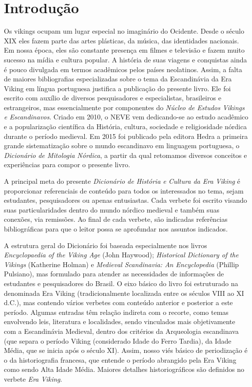 \chapter[Introdução, \emph{por Johnni Langer}]{Introdução}\label{introd}

Os vikings ocupam um lugar especial no imaginário do Ocidente. Desde o
século XIX eles fazem parte das artes plásticas, da música, das
identidades nacionais. Em nossa época, eles são constante presença em
filmes e televisão e fazem muito sucesso na mídia e cultura popular. A
história de suas viagens e conquistas ainda é pouco divulgada em termos
acadêmicos pelos países neolatinos. Assim, a falta de maiores
bibliografias especializadas sobre o tema da Escandinávia da Era Viking
em língua portuguesa justifica a publicação do presente livro. Ele foi
escrito com auxílio de diversos pesquisadores e especialistas,
brasileiros e estrangeiros, mas essencialmente por componentes do
\emph{Núcleo de Estudos Vikings e Escandinavos}. Criado em 2010, o NEVE
vem dedicando-se ao estudo acadêmico e a popularização científica da
História, cultura, sociedade e religiosidade nórdica durante o período
medieval. Em 2015 foi publicado pela editora Hedra a primeira grande
sistematização sobre o mundo escandinavo em linguagem portuguesa, o
\emph{Dicionário de Mitologia Nórdica}, a partir da qual retomamos
diversos conceitos e experiências para compor o presente livro.

A principal meta do presente \emph{Dicionário de História e Cultura da
Era Viking} é proporcionar referenciais de conteúdo para todos os
interessados no tema, sejam estudantes, pesquisadores ou apenas
entusiastas. Cada verbete foi escrito visando suas particularidades
dentro do mundo nórdico medieval e também suas conexões, via remissões.
Ao final de cada verbete, são indicadas referências bibliográficas para
que o leitor possa se aprofundar nos assuntos indicados.

A estrutura geral do Dicionário foi baseada especialmente nos livros
\emph{Encyclopaedia of the Viking Age} (John Haywood); \emph{Historical
Dictionary of the Vikings} (Katherine Holman) e \emph{Medieval
Scandinavia: An Encyclopedia} (Phillip Pulsiano), mas formulado para
atender as necessidades de informações de estudantes e pesquisadores do
Brasil. O eixo básico do livro foi estruturado na denominada Era Viking
(tradicionalmente localizada entre os séculos VIII ao XI d.C.), mas
contendo vários verbetes com conteúdo anterior e posterior a este
período. Algumas entradas têm relação indireta com o recorte, como temas
envolvendo leis, literatura e localidades, sendo vinculados mais
objetivamente com a Escandinávia Medieval, dentro dos critérios da
Arqueologia escandinava (que separa o período Viking (considerado Idade
do Ferro Tardia), da Idade Média, que se inicia após o século XI).
Assim, nosso viés básico de periodização é o da historiografia francesa,
que entende o período abrangido pela Era Viking como sendo Alta Idade
Média. Maiores detalhes historiográficos são definidos no verbete
\emph{Era Viking}.

